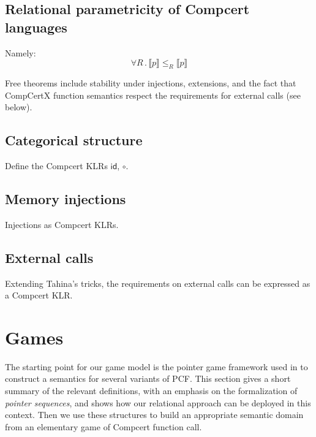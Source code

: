 \documentclass[acmsmall,anonymous]{acmart}
\newcommand{\kw}[1]{\ensuremath{ \textsf{#1} }}
\begin{document}

\subsection{Relational parametricity of Compcert languages} %

Namely:
\[ \forall R \,.\, \llbracket p \rrbracket \le_R \llbracket p \rrbracket \]

Free theorems include
stability under injections, extensions,
and the fact that CompCertX function semantics
respect the requirements for external calls (see below).


\subsection{Categorical structure} %

Define the Compcert KLRs \kw{id}, $\circ$.


\subsection{Memory injections} %

Injections as Compcert KLRs.


\subsection{External calls} %

Extending Tahina's tricks,
the requirements on
external calls
can be expressed as a Compcert KLR.



\newpage
\section{Games} %

The starting point for our game model
is the pointer game framework used in \citep{gamesem99}
to construct a semantics for several variants of PCF.
This section gives a short summary of the relevant definitions,
with an emphasis on the formalization of \emph{pointer sequences},
and shows how our relational approach can be deployed in this context.
Then we use these structures
to build an appropriate semantic domain
from an elementary game of Compcert function call.
\end{document}
